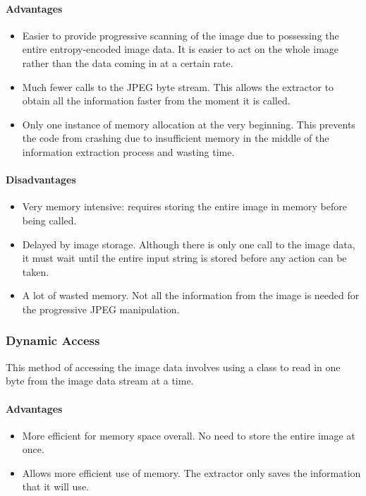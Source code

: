 \paragraph*{Advantages}
\begin{itemize}
	\item Easier to provide progressive scanning of the image due to possessing the entire entropy-encoded image data. It is 
		easier to act on the whole image rather than the data coming in at a certain rate.
	\item Much fewer calls to the JPEG byte stream. This allows the extractor to obtain all the information faster from the moment it is called.
	\item Only one instance of memory allocation at the very beginning. 
		This prevents the code from crashing due to insufficient memory in the middle of the information extraction process and wasting time.
\end{itemize}

\paragraph*{Disadvantages}
\begin{itemize}
	\item Very memory intensive: requires storing the entire image in memory before being called.
	\item Delayed by image storage. Although there is only one call to the image data, it 
		must wait until the entire input string is stored before any action can be taken.
	\item A lot of wasted memory. Not all the information from the image is needed for the progressive JPEG manipulation.
\end{itemize}

\subsubsection*{Dynamic Access}

This method of accessing the image data involves using a class to read in one byte from the image data stream at a time.

\paragraph*{Advantages}
\begin{itemize}
	\item More efficient for memory space overall. No need to store the entire image at once.
	\item Allows more efficient use of memory. The extractor only saves the information that it will use.
\end{itemize}

